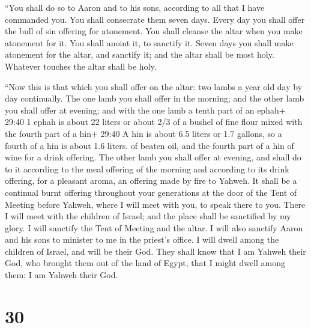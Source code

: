  ``You shall do so to Aaron and to his sons, according to
all that I have commanded you. You shall consecrate them seven days.
 Every day you shall offer the bull of sin offering for
atonement. You shall cleanse the altar when you make atonement for it.
You shall anoint it, to sanctify it.  Seven days you shall
make atonement for the altar, and sanctify it; and the altar shall be
most holy. Whatever touches the altar shall be holy.

 ``Now this is that which you shall offer on the altar: two
lambs a year old day by day continually.  The one lamb you
shall offer in the morning; and the other lamb you shall offer at
evening;  and with the one lamb a tenth part of an ephah+
29:40 1 ephah is about 22 liters or about 2/3 of a bushel of fine flour
mixed with the fourth part of a hin+ 29:40 A hin is about 6.5 liters or
1.7 gallons, so a fourth of a hin is about 1.6 liters. of beaten oil,
and the fourth part of a hin of wine for a drink offering. 
The other lamb you shall offer at evening, and shall do to it according
to the meal offering of the morning and according to its drink offering,
for a pleasant aroma, an offering made by fire to Yahweh. 
It shall be a continual burnt offering throughout your generations at
the door of the Tent of Meeting before Yahweh, where I will meet with
you, to speak there to you.  There I will meet with the
children of Israel; and the place shall be sanctified by my glory.
 I will sanctify the Tent of Meeting and the altar. I will
also sanctify Aaron and his sons to minister to me in the priest's
office.  I will dwell among the children of Israel, and
will be their God.  They shall know that I am Yahweh their
God, who brought them out of the land of Egypt, that I might dwell among
them: I am Yahweh their God.

\hypertarget{section-29}{%
\section{30}\label{section-29}}

